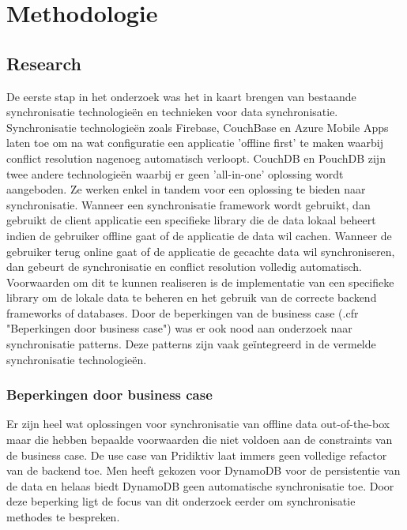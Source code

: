 
\chapter{Methodologie}
\label{ch:methodologie}


\section{Research}
De eerste stap in het onderzoek was het in kaart brengen van bestaande synchronisatie technologie\"en en technieken voor data synchronisatie. Synchronisatie technologie\"en zoals Firebase, CouchBase en Azure Mobile Apps laten toe om na wat configuratie een applicatie 'offline first' te maken waarbij conflict resolution nagenoeg automatisch verloopt. CouchDB en PouchDB zijn twee andere technologie\"en waarbij er geen 'all-in-one' oplossing wordt aangeboden. Ze werken enkel in tandem voor een oplossing te bieden naar synchronisatie. Wanneer een synchronisatie framework wordt gebruikt, dan gebruikt de client applicatie een specifieke library die de data lokaal beheert indien de gebruiker offline gaat of de applicatie de data wil cachen. Wanneer de gebruiker terug online gaat of de applicatie de gecachte data wil synchroniseren, dan gebeurt de synchronisatie en conflict resolution volledig automatisch. Voorwaarden om dit te kunnen realiseren is de implementatie van een specifieke library om de lokale data te beheren en het gebruik van de correcte backend frameworks of databases.
Door de beperkingen van de business case (.cfr "Beperkingen door business case") was er ook nood aan onderzoek naar synchronisatie patterns. Deze patterns zijn vaak ge\"integreerd in de vermelde synchronisatie technologie\"en.
\clearpage
\subsection{Beperkingen door business case}
Er zijn heel wat oplossingen voor synchronisatie van offline data out-of-the-box maar die hebben bepaalde voorwaarden die niet voldoen aan de constraints van de business case. De use case van Pridiktiv laat immers geen volledige refactor van de backend toe. Men heeft gekozen voor DynamoDB voor de persistentie van de data en helaas biedt DynamoDB geen automatische synchronisatie toe. Door deze beperking ligt de focus van dit onderzoek eerder om synchronisatie methodes te bespreken.
